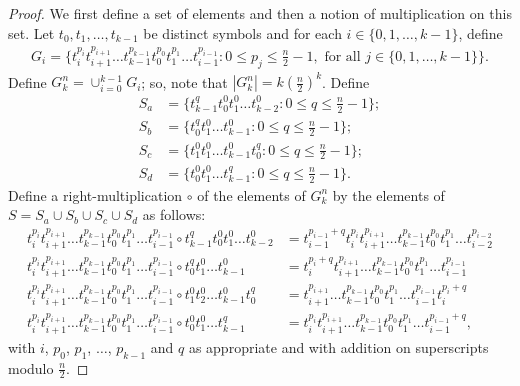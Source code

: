 \documentclass{article}
\begin{document}
\begin{proof}
We first define a set of elements and then a notion of multiplication on this set. Let $t_0,t_1,\ldots,t_{k-1}$ be distinct symbols and for each $i\in\{0,1,\ldots,k-1\}$, define
\begin{align*}
G_i = \{t_i^{p_i}t_{i+1}^{p_{i+1}}\ldots t_{k-1}^{p_{k-1}}t_0^{p_0}t_1^{p_1}\ldots t_{i-1}^{p_{i-1}} : 0\leq p_j\leq \frac{n}{2}-1, \text{ for all }j\in\{0,1,\ldots,k-1\}\}.
\end{align*}
Define $G_k^n = \cup_{i=0}^{k-1}G_i$; so, note that $|G_k^n| = k(\frac{n}{2})^k$. Define
\begin{align*}
S_a &= \{t_{k-1}^{q}t_{0}^{0} t_{1}^{0}\ldots t_{k-2}^{0} : 0\leq q\leq \frac{n}{2}-1\};\\
S_b &= \{t_{0}^{q}t_{1}^{0} \ldots t_{k-1}^{0} : 0\leq q\leq \frac{n}{2}-1\};\\
S_c &= \{t_1^{0}t_{1}^{0}\ldots t_{k-1}^{0}t_0^{q} : 0\leq q\leq \frac{n}{2}-1\};\\
S_d &= \{t_{0}^{0}t_{1}^{0} \ldots t_{k-1}^{q} : 0\leq q\leq \frac{n}{2}-1\}.
\end{align*}
Define a right-multiplication $\circ$ of the elements of $G_k^n$ by the elements of $S = S_a\cup S_b\cup S_c\cup S_d$ as follows:
\begin{align*}
t_i^{p_i}t_{i+1}^{p_{i+1}}\ldots t_{k-1}^{p_{k-1}}t_0^{p_0}t_1^{p_1}\ldots t_{i-1}^{p_{i-1}} \circ t_{k-1}^{q}t_{0}^{0} t_{1}^{0}\ldots t_{k-2}^{0} &= t_{i-1}^{p_{i-1}+ q}t_i^{p_i}t_{i+1}^{p_{i+1}}\ldots t_{k-1}^{p_{k-1}}t_0^{p_0}t_1^{p_1}\ldots t_{i-2}^{p_{i-2}}\\
t_i^{p_i}t_{i+1}^{p_{i+1}}\ldots t_{k-1}^{p_{k-1}}t_0^{p_0}t_1^{p_1}\ldots t_{i-1}^{p_{i-1}} \circ t_{0}^{q}t_{1}^{0} \ldots t_{k-1}^{0} &= t_i^{p_i+q}t_{i+1}^{p_{i+1}}\ldots t_{k-1}^{p_{k-1}}t_0^{p_0}t_1^{p_1}\ldots t_{i-1}^{p_{i-1}}\\
t_i^{p_i}t_{i+1}^{p_{i+1}}\ldots t_{k-1}^{p_{k-1}}t_0^{p_0}t_1^{p_1}\ldots t_{i-1}^{p_{i-1}} \circ t_1^{0}t_{2}^{0}\ldots t_{k-1}^{0}t_0^{q} &= t_{i+1}^{p_{i+1}}\ldots t_{k-1}^{p_{k-1}}t_0^{p_0}t_1^{p_1}\ldots t_{i-1}^{p_{i-1}}t_i^{p_i+q}\\
t_i^{p_i}t_{i+1}^{p_{i+1}}\ldots t_{k-1}^{p_{k-1}}t_0^{p_0}t_1^{p_1}\ldots t_{i-1}^{p_{i-1}} \circ t_{0}^{0}t_{1}^{0} \ldots t_{k-1}^{q} &= t_i^{p_i}t_{i+1}^{p_{i+1}}\ldots t_{k-1}^{p_{k-1}}t_0^{p_0}t_1^{p_1}\ldots t_{i-1}^{p_{i-1}+q},
\end{align*}
with $i$, $p_0$, $p_1$, $\ldots$, $p_{k-1}$ and $q$ as appropriate and with addition on superscripts modulo $\frac{n}{2}$. 


\end{proof}
\end{document}
